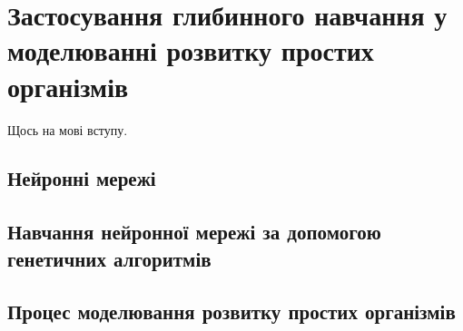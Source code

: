 \chapter{Застосування глибинного навчання у моделюванні розвитку простих організмів}
\label{chap:theory}

Щось на мові вступу.


\section{Нейронні мережі}





\section{Навчання нейронної мережі за допомогою генетичних алгоритмів}



\section{Процес моделювання розвитку простих організмів}



